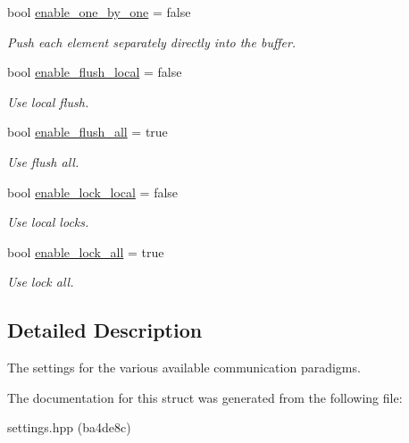\begin{DoxyCompactItemize}
bool \hyperlink{structSchwarzWrappers_1_1Settings_1_1comm__settings_a94a65410d1c436a47dbb116b5d3d5af1}{enable\+\_\+one\+\_\+by\+\_\+one} = false
\begin{DoxyCompactList}\small\item\em Push each element separately directly into the buffer. \end{DoxyCompactList}\item 
\mbox{\label{structSchwarzWrappers_1_1Settings_1_1comm__settings_a70c60458477096cecd87a53139ee61e8}} 
bool \hyperlink{structSchwarzWrappers_1_1Settings_1_1comm__settings_a70c60458477096cecd87a53139ee61e8}{enable\+\_\+flush\+\_\+local} = false
\begin{DoxyCompactList}\small\item\em Use local flush. \end{DoxyCompactList}\item 
\mbox{\label{structSchwarzWrappers_1_1Settings_1_1comm__settings_a147d1ec7e1eaa5bea9e640d0bb6a7636}} 
bool \hyperlink{structSchwarzWrappers_1_1Settings_1_1comm__settings_a147d1ec7e1eaa5bea9e640d0bb6a7636}{enable\+\_\+flush\+\_\+all} = true
\begin{DoxyCompactList}\small\item\em Use flush all. \end{DoxyCompactList}\item 
\mbox{\label{structSchwarzWrappers_1_1Settings_1_1comm__settings_aef1f78be36243e63b9ef7c04dee35f1b}} 
bool \hyperlink{structSchwarzWrappers_1_1Settings_1_1comm__settings_aef1f78be36243e63b9ef7c04dee35f1b}{enable\+\_\+lock\+\_\+local} = false
\begin{DoxyCompactList}\small\item\em Use local locks. \end{DoxyCompactList}\item 
\mbox{\label{structSchwarzWrappers_1_1Settings_1_1comm__settings_a9158358e7f737ae5769c5c51730dee7b}} 
bool \hyperlink{structSchwarzWrappers_1_1Settings_1_1comm__settings_a9158358e7f737ae5769c5c51730dee7b}{enable\+\_\+lock\+\_\+all} = true
\begin{DoxyCompactList}\small\item\em Use lock all. \end{DoxyCompactList}\end{DoxyCompactItemize}


\subsection{Detailed Description}
The settings for the various available communication paradigms. 

The documentation for this struct was generated from the following file\+:\begin{DoxyCompactItemize}
\item 
settings.\+hpp (ba4de8c)\end{DoxyCompactItemize}
